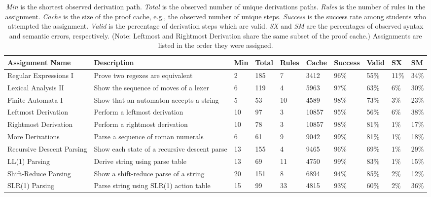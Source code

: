 \documentclass{sigchi}
\newcommand\tabhead[1]{\small\textbf{#1}}
\begin{document}
\begin{table}[!ht]\footnotesize
  \renewcommand{\arraystretch}{1.5}
  \begin{tabular}{|p{3.4cm}|p{4.4cm}|p{.7cm}|p{.7cm}|p{.7cm}|p{.7cm}|p{.8cm}|p{.7cm}||p{.7cm}|p{.7cm}|}
    \hline
    \tabhead{Assignment Name} & \tabhead{Description} & \tabhead{Min} & \tabhead{Total} & \tabhead{Rules} & \tabhead{Cache} & \tabhead{Success} & \tabhead{Valid} & \tabhead{SX} & \tabhead{SM} \\
    \hline
    Regular Expressions I & \scriptsize{Prove two regexes are equivalent} & 2 & 185 & 7 & 3412 & 96\% & 55\% & 11\% & 34\% \\
    \hline
    Lexical Analysis II & \scriptsize{Show the sequence of moves of a lexer} & 6 & 119 & 4 & 5963 & 97\% & 63\% & 6\% & 30\% \\
    \hline
    Finite Automata I & \scriptsize{Show that an automaton accepts a string} & 5 & 53 & 10 & 4589 & 98\% & 73\% & 3\% & 23\% \\
    \hline
    Leftmost Derivation & \scriptsize{Perform a leftmost derivation} & 10 & 97 & 3 & 10857 & 95\% & 56\% & 6\% & 38\% \\
    \hline
    Rightmost Derivation & \scriptsize{Perform a rightmost derivation} & 10 & 78 & 3 & 10857 & 98\% & 81\%  & 1\% & 17\% \\
    \hline
    More Derivations & \scriptsize{Parse a sequence of roman numerals} & 6 & 61 & 9 & 9042 & 99\% & 81\% & 1\% & 18\% \\
    \hline
    Recursive Descent Parsing & \scriptsize{Show each state of a recursive descent parse } & 13 & 155 & 4 & 9465 & 96\% & 69\% & 1\% & 29\% \\
    \hline
    LL(1) Parsing & \scriptsize{Derive string using parse table} & 13 & 69 & 11 & 4750 & 99\% & 83\% & 1\% & 15\% \\
    \hline
    Shift-Reduce Parsing & \scriptsize{Show a shift-reduce parse of a string} & 20 & 151 & 8 & 6894 & 94\% & 85\% & 2\% & 12\% \\
    \hline
    SLR(1) Parsing & \scriptsize{Parse string using SLR(1) action table} & 15 & 99 & 33 & 4815 & 93\% & 60\% & 2\% & 36\% \\
    \hline
  \end{tabular}
  \caption{\textit{Min} is the shortest observed derivation path. \textit{Total} is the observed number of unique derivations paths. \textit{Rules} is the number of rules in the assignment. \textit{Cache} is the size of the proof cache, e.g., the observed number of unique steps. \textit{Success} is the success rate among students who attempted the assignment. \textit{Valid} is the percentage of derivation steps which are valid. \textit{SX} and \textit{SM} are the percentages of observed syntax and semantic errors, respectively. (Note: Leftmost and Rightmost Derivation share the same subset of the proof cache.) Assignments are listed in the order they were assigned.}
  \label{tab:table1}
\end{table}
\end{document}
